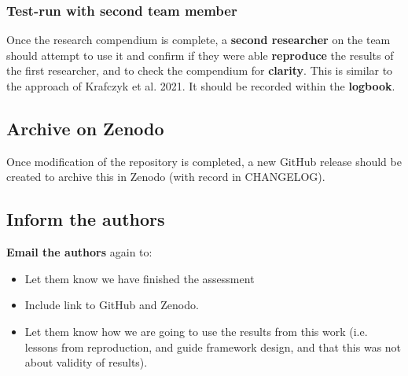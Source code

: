 \vspace{0.5cm}
\subsubsection{Test-run with second team member}

Once the research compendium is complete, a \textbf{second researcher} on the team should attempt to use it and confirm if they were able \textbf{reproduce} the results of the first researcher, and to check the compendium for \textbf{clarity}. This is similar to the approach of Krafczyk et al. 2021.\autocite{krafczyk_learning_2021} It should be recorded within the \textbf{logbook}.

\vspace{1cm}
\subsection{Archive on Zenodo}

Once modification of the repository is completed, a new GitHub release should be created to archive this in Zenodo (with record in CHANGELOG).

\vspace{0.5cm}
\subsection{Inform the authors}

\textbf{Email the authors} again to:
\begin{itemize}
    \item Let them know we have finished the assessment
    \item Include link to GitHub and Zenodo.
    \item Let them know how we are going to use the results from this work (i.e. lessons from reproduction, and guide framework design, and that this was not about validity of results).
\end{itemize}